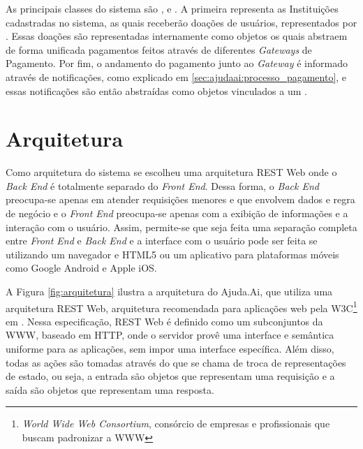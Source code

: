 As principais classes do sistema são ,  e . A primeira representa as Instituições cadastradas no sistema, as quais receberão doações de usuários, representados por . Essas doações são representadas internamente como objetos  os quais abstraem de forma unificada pagamentos feitos através de diferentes \emph{Gateways} de Pagamento. Por fim, o andamento do pagamento junto ao \emph{Gateway} é informado através de notificações, como explicado em \ref{sec:ajudaai:processo_pagamento}, e essas notificações são então abstraídas como objetos  vinculados a um .







\section{Arquitetura} \label{sec:ajudaai:arquitetura}

Como arquitetura do sistema se escolheu uma arquitetura REST Web onde o \emph{Back End} é totalmente separado do \emph{Front End}. Dessa forma, o \emph{Back End} preocupa-se apenas em atender requisições menores e que envolvem dados e regra de negócio e o \emph{Front End} preocupa-se apenas com a exibição de informações e a interação com o usuário. Assim, permite-se que seja feita uma separação completa entre \emph{Front End} e \emph{Back End} e a interface com o usuário pode ser feita se utilizando um navegador e HTML5 ou um aplicativo para plataformas móveis como Google Android e Apple iOS.

A Figura \ref{fig:arquitetura} ilustra a arquitetura do Ajuda.Ai, que utiliza uma arquitetura REST Web, arquitetura recomendada para aplicações web pela W3C\footnote{\emph{World Wide Web Consortium}, consórcio de empresas e profissionais que buscam padronizar a WWW} em \cite{booth2004webservices}. Nessa especificação, REST Web é definido como um subconjuntos da WWW, baseado em HTTP, onde o servidor provê uma interface e semântica uniforme para as aplicações, sem impor uma interface específica. Além disso, todas as ações são tomadas através do que se chama de troca de representações de estado, ou seja, a entrada são objetos que representam uma requisição e a saída são objetos que representam uma resposta.


